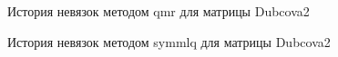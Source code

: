 \begin{figure}
    \renewcommand{\figurename}{Рисунок}
    \caption{История невязок методом qmr для матрицы Dubcova2}
    \label{fig:image}
\end{figure}

\begin{figure}
    \renewcommand{\figurename}{Рисунок}
    \caption{История невязок методом symmlq для матрицы Dubcova2}
    \label{fig:image}
\end{figure}

